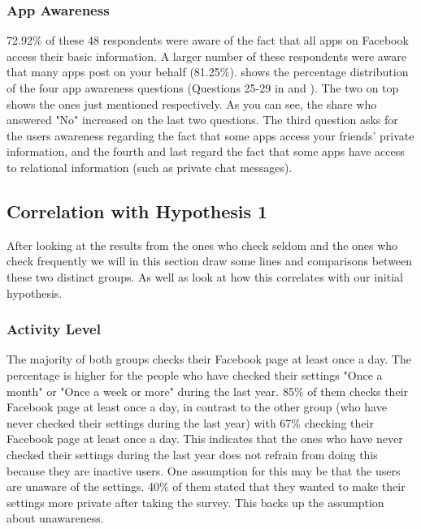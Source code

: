 

\subsubsection{App Awareness}
72.92\% of these 48 respondents were aware of the fact that all apps on Facebook access their basic information. A larger number of these respondents were aware that many apps post on your behalf (81.25\%).  shows the percentage distribution of the four app awareness questions (Questions 25-29 in  and ). The two on top shows the ones just mentioned respectively. As you can see, the share who answered "No" increased on the last two questions. The third question asks for the users awareness regarding the fact that some apps access your friends' private information, and the fourth and last regard the fact that some apps have access to relational information (such as private chat messages).  


\subsection{Correlation with Hypothesis 1}
After looking at the results from the ones who check seldom and the ones who check frequently we will in this section draw some lines and comparisons between these two distinct groups. As well as look at how this correlates with our initial hypothesis. 

\subsubsection{Activity Level}
The majority of both groups checks their Facebook page at least once a day. The percentage is higher for the people who have checked their settings "Once a month" or "Once a week or more" during the last year. 85\% of them checks their Facebook page at least once a day, in contrast to the other group (who have never checked their settings during the last year) with 67\% checking their Facebook page at least once a day. This indicates that the ones who have never checked their settings during the last year does not refrain from doing this because they are inactive users. One assumption for this may be that the users are unaware of the settings. 40\% of them stated that they wanted to make their settings more private after taking the survey. This backs up the assumption about unawareness.  

